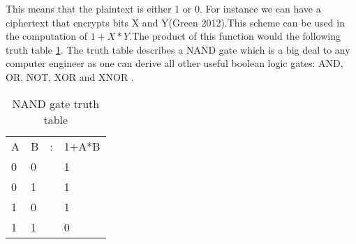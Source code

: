 \newpage
This means that the plaintext is either 1 or 0. For instance we can have a ciphertext that encrypts bits X and Y(Green 2012).This scheme can be used in the computation of $1+X*Y$.The product of this function would the following truth table \ref{my-label}. The truth table describes a NAND gate which is a big deal to any computer engineer as one can derive all other useful boolean logic gates: AND, OR, NOT, XOR and XNOR \cite{green2012}.

\begin{table}[]
\centering
\caption{NAND gate truth table}
\label{my-label}
\begin{tabular}{llll}
A & B & : & 1+A*B \\
0 & 0 &   & 1     \\
0 & 1 &   & 1     \\
1 & 0 &   & 1     \\
1 & 1 &   & 0
\end{tabular}
\end{table}



